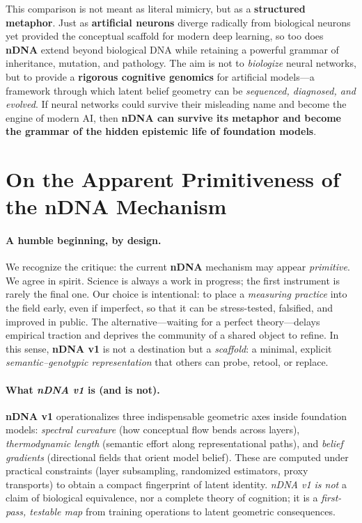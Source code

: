\documentclass[11pt]{article}
\begin{document}
\noindent
This comparison is not meant as literal mimicry, but as a \textbf{structured metaphor}. 
Just as \textbf{artificial neurons} diverge radically from biological neurons yet provided the conceptual scaffold 
for modern deep learning, so too does \textbf{nDNA} extend beyond biological DNA while retaining a powerful grammar 
of inheritance, mutation, and pathology. The aim is not to \emph{biologize} neural networks, but to provide a 
\textbf{rigorous cognitive genomics} for artificial models---a framework through which latent belief geometry can be 
\emph{sequenced, diagnosed, and evolved}. 
If neural networks could survive their misleading name and become the engine of modern AI, then \textbf{nDNA can survive 
its metaphor and become the grammar of the hidden epistemic life of foundation models}.














\section{On the Apparent Primitiveness of the nDNA Mechanism}

\paragraph{A humble beginning, by design.}
We recognize the critique: the current \textbf{nDNA} mechanism may appear \emph{primitive}. We agree in spirit. Science is always a work in progress; the first instrument is rarely the final one. Our choice is intentional: to place a \emph{measuring practice} into the field early, even if imperfect, so that it can be stress-tested, falsified, and improved in public. The alternative---waiting for a perfect theory---delays empirical traction and deprives the community of a shared object to refine. In this sense, \textbf{nDNA v1} is not a destination but a \emph{scaffold}: a minimal, explicit \emph{semantic--genotypic representation} that others can probe, retool, or replace.

\paragraph{What \emph{nDNA v1} is (and is not).}
\textbf{nDNA v1} operationalizes three indispensable geometric axes inside foundation models: \emph{spectral curvature} (how conceptual flow bends across layers), \emph{thermodynamic length} (semantic effort along representational paths), and \emph{belief gradients} (directional fields that orient model belief). These are computed under practical constraints (layer subsampling, randomized estimators, proxy transports) to obtain a compact fingerprint of latent identity. \emph{nDNA v1 is not} a claim of biological equivalence, nor a complete theory of cognition; it is a \emph{first-pass, testable map} from training operations to latent geometric consequences.
\end{document}

